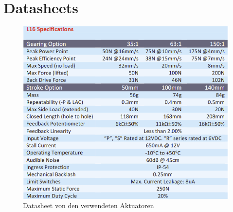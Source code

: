 \chapter{Datasheets}
\begin{figure}[H]
    \centering
    \includegraphics[width=1\linewidth]{assets/L16_Actuonix.png}
    \caption{Datasheet von den verwendeten Aktuatoren}
    \label{fig:enter-label}
\end{figure}